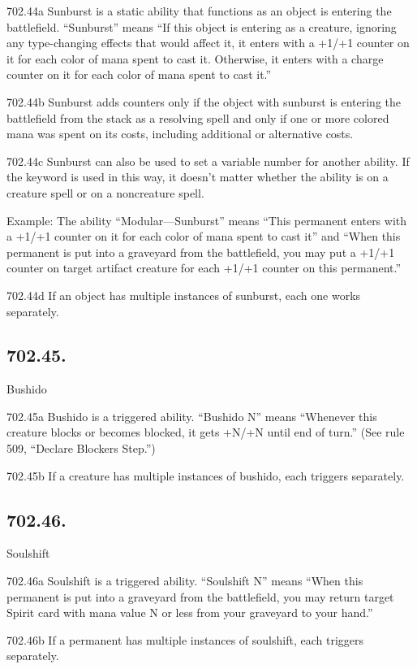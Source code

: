 702.44a Sunburst is a static ability that functions as an object is entering the battlefield. “Sunburst” means “If this object is entering as a creature, ignoring any type-changing effects that would affect it, it enters with a +1/+1 counter on it for each color of mana spent to cast it. Otherwise, it enters with a charge counter on it for each color of mana spent to cast it.”

702.44b Sunburst adds counters only if the object with sunburst is entering the battlefield from the stack as a resolving spell and only if one or more colored mana was spent on its costs, including additional or alternative costs.

702.44c Sunburst can also be used to set a variable number for another ability. If the keyword is used in this way, it doesn’t matter whether the ability is on a creature spell or on a noncreature spell.

Example: The ability “Modular—Sunburst” means “This permanent enters with a +1/+1 counter on it for each color of mana spent to cast it” and “When this permanent is put into a graveyard from the battlefield, you may put a +1/+1 counter on target artifact creature for each +1/+1 counter on this permanent.”

702.44d If an object has multiple instances of sunburst, each one works separately.

\subsection*{702.45.}
Bushido

702.45a Bushido is a triggered ability. “Bushido N” means “Whenever this creature blocks or becomes blocked, it gets +N/+N until end of turn.” (See rule 509, “Declare Blockers Step.”)

702.45b If a creature has multiple instances of bushido, each triggers separately.

\subsection*{702.46.}
Soulshift

702.46a Soulshift is a triggered ability. “Soulshift N” means “When this permanent is put into a graveyard from the battlefield, you may return target Spirit card with mana value N or less from your graveyard to your hand.”

702.46b If a permanent has multiple instances of soulshift, each triggers separately.

